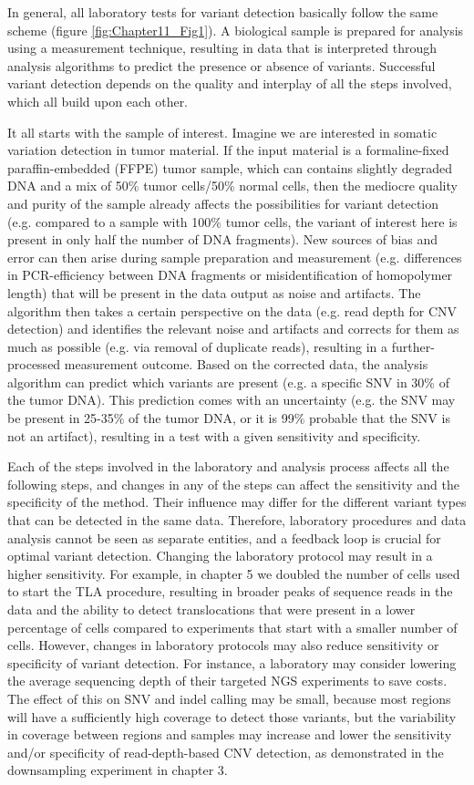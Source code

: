 In general, all laboratory tests for variant detection basically follow the same scheme (figure \ref{fig:Chapter11_Fig1}). 
A biological sample is prepared for analysis using a measurement technique, resulting in data that is interpreted through analysis algorithms to predict the presence or absence of variants.
Successful variant detection depends on the quality and interplay of all the steps involved, which all build upon each other.

It all starts with the sample of interest. 
Imagine we are interested in somatic variation detection in tumor material. 
If the input material is a formaline-fixed paraffin-embedded (FFPE) tumor sample, which can contains slightly degraded DNA and a mix of 50\% tumor cells/50\% normal cells, then the mediocre quality and purity of the sample already affects the possibilities for variant detection (e.g. compared to a sample with 100\% tumor cells, the variant of interest here is present in only half the number of DNA fragments). 
New sources of bias and error can then arise during sample preparation and measurement (e.g. differences in PCR-efficiency between DNA fragments or misidentification of homopolymer length) that will be present in the data output as noise and artifacts. 
The algorithm then takes a certain perspective on the data (e.g. read depth for CNV detection) and identifies the relevant noise and artifacts and corrects for them as much as possible (e.g. via removal of duplicate reads), resulting in a further-processed measurement outcome. 
Based on the corrected data, the analysis algorithm can predict which variants are present (e.g. a specific SNV in 30\% of the tumor DNA). 
This prediction comes with an uncertainty (e.g. the SNV may be present in 25-35\% of the tumor DNA, or it is 99\% probable that the SNV is not an artifact), resulting in a test with a given sensitivity and specificity.

Each of the steps involved in the laboratory and analysis process affects all the following steps, and changes in any of the steps can affect the sensitivity and the specificity of the method.
Their influence may differ for the different variant types that can be detected in the same data.
Therefore, laboratory procedures and data analysis cannot be seen as separate entities, and a feedback loop is crucial for optimal variant detection. 
Changing the laboratory protocol may result in a higher sensitivity. For example, in chapter 5 we doubled the number of cells used to start the TLA procedure, resulting in broader peaks of sequence reads in the data and the ability to detect translocations that were present in a lower percentage of cells compared to experiments that start with a smaller number of cells. However, changes in laboratory protocols may also reduce sensitivity
or specificity of variant detection. 
For instance, a laboratory may consider lowering the average sequencing depth of their targeted NGS experiments to save costs. 
The effect of this on SNV and indel calling may be small, because most regions will have a sufficiently high coverage to detect those variants, but the variability in coverage between regions and samples may increase and lower the sensitivity and/or specificity of read-depth-based CNV detection, as demonstrated in the downsampling experiment in chapter 3. 

